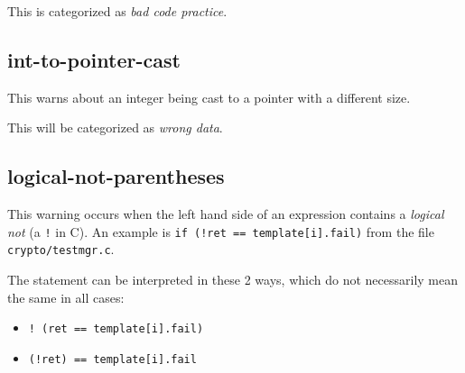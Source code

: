 \documentclass[a4paper,11pt]{report}
\newcommand{\textcode}[1]{\fboxsep=1pt\texttt{\colorbox{gray!20}{#1}}}
\begin{document}
This is categorized as \emph{bad code practice}.


            %


            %

            \subsection*{int-to-pointer-cast}
This warns about an integer being cast to a pointer with a different size.

This will be categorized as \emph{wrong data}.


            \iffalse %

            \subsection*{logical-not-parentheses}
This warning occurs when the left hand side of an expression contains a 
\emph{logical not} (a \texttt{!} in C). An example is 
    \textcode{if (!ret == template[i].fail)} 
from the file \texttt{crypto/testmgr.c}.

The statement can be interpreted in these 2 ways, which do not necessarily mean 
the same in all cases:

\begin{itemize}
    \item \textcode{!\ (ret == template[i].fail)} 
    \item \textcode{(!ret) == template[i].fail}
\end{itemize}
\end{document}
